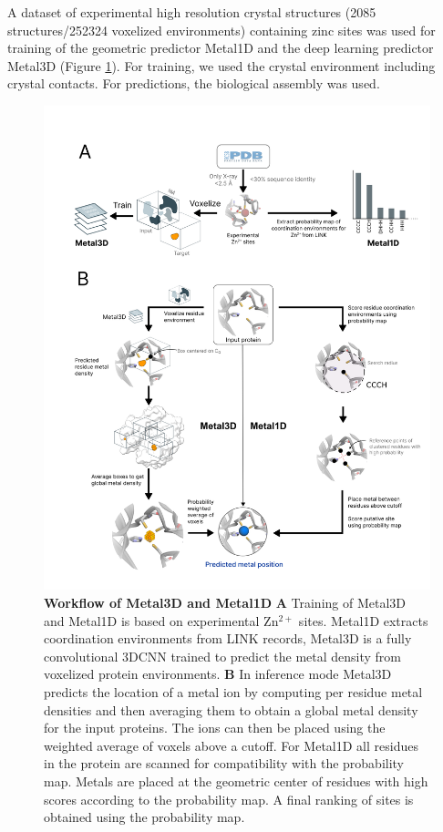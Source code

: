 \documentclass[ lineno,
  9pt]{elife}
\begin{document}
A dataset of experimental high resolution crystal structures (2085 structures/252324 voxelized environments) containing zinc sites was used for training of the geometric predictor Metal1D and the deep learning predictor Metal3D (Figure \ref{fig:method}). For training, we used the crystal environment including crystal contacts. For predictions, the biological assembly was used.

\begin{figure}
\hypertarget{fig:method}{%
\centering
\includegraphics{images/Metal3D_Metal1D_method.png}
\caption{\textbf{Workflow of Metal3D and Metal1D} \textbf{A} Training of Metal3D and Metal1D is based on experimental Zn$^{2+}$ sites. Metal1D extracts coordination environments from LINK records, Metal3D is a fully convolutional 3DCNN trained to predict the metal density from voxelized protein environments. \textbf{B} In inference mode Metal3D predicts the location of a metal ion by computing per residue metal densities and then averaging them to obtain a global metal density for the input proteins. The ions can then be placed using the weighted average of voxels above a cutoff. For Metal1D all residues in the protein are scanned for compatibility with the probability map. Metals are placed at the geometric center of residues with high scores according to the probability map. A final ranking of sites is obtained using the probability map.}\label{fig:method}
}
\end{figure}
\end{document}
